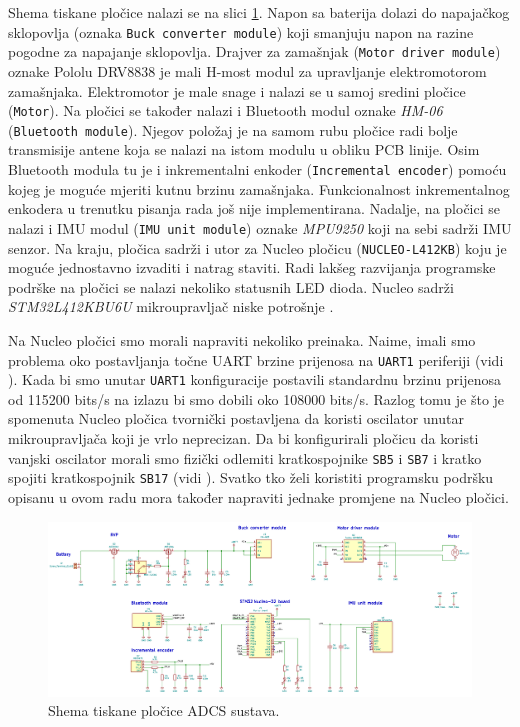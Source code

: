 \documentclass[times, utf8, diplomski, numeric]{templates/template}
\begin{document}
{{{            Shema tiskane pločice nalazi se na slici \ref{fig:plocica_shema}. Napon sa baterija dolazi do napajačkog sklopovlja (oznaka \texttt{Buck converter module}) koji smanjuju napon na razine pogodne za napajanje sklopovlja. Drajver za zamašnjak (\texttt{Motor driver module}) oznake Pololu DRV8838 \cite{pololu} je mali H-most modul za upravljanje elektromotorom zamašnjaka. Elektromotor je male snage i nalazi se u samoj sredini pločice (\texttt{Motor}). Na pločici se također nalazi i Bluetooth modul oznake \emph{HM-06} (\texttt{Bluetooth module}). Njegov položaj je na samom rubu pločice radi bolje transmisije antene koja se nalazi na istom modulu u obliku PCB linije. Osim Bluetooth modula tu je i inkrementalni enkoder (\texttt{Incremental encoder}) pomoću kojeg je moguće mjeriti kutnu brzinu zamašnjaka. Funkcionalnost inkrementalnog enkodera u trenutku pisanja rada još nije implementirana. Nadalje, na pločici se nalazi i IMU modul (\texttt{IMU unit module}) oznake \emph{MPU9250} koji na sebi sadrži IMU senzor. Na kraju, pločica sadrži i utor za Nucleo pločicu (\texttt{NUCLEO-L412KB}) \cite{nucleo_um} koju je moguće jednostavno izvaditi i natrag staviti. Radi lakšeg razvijanja programske podrške na pločici se nalazi nekoliko statusnih LED dioda. Nucleo sadrži \emph{STM32L412KBU6U} mikroupravljač niske potrošnje \cite{uc_um}.

            Na Nucleo pločici smo morali napraviti nekoliko preinaka. Naime, imali smo problema oko postavljanja točne UART brzine prijenosa  na \texttt{UART1} periferiji (vidi \cite{uc_um}). Kada bi smo unutar \texttt{UART1} konfiguracije postavili standardnu brzinu prijenosa od 115200 bits/s na izlazu bi smo dobili oko 108000 bits/s. Razlog tomu je što je spomenuta Nucleo pločica tvornički postavljena da koristi oscilator unutar mikroupravljača koji je vrlo neprecizan. Da bi konfigurirali pločicu da koristi vanjski oscilator morali smo fizički odlemiti kratkospojnike \texttt{SB5} i \texttt{SB7} i kratko spojiti kratkospojnik \texttt{SB17} (vidi \cite{nucleo_um}). Svatko tko želi koristiti programsku podršku opisanu u ovom radu mora također napraviti jednake promjene na Nucleo pločici.

            \begin{figure}[htb]
            \centering
            \includegraphics[width=1.0\textwidth]{images/plocica_shema.png}
            \caption{Shema tiskane pločice ADCS sustava.}
            \label{fig:plocica_shema}
            \end{figure}
        }

}}
\end{document}
